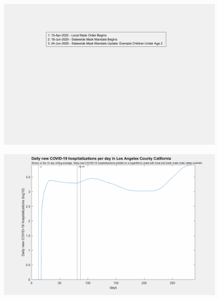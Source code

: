 \documentclass[]{article}
\begin{document}
\begin{figure}[!h]
	\includegraphics[width=\linewidth]{legends/los_angeles_mask_order_legend.png}
	\caption{}
	\label{fig:legends/los_angeles_mask_order_legendLabel}
\end{figure}

\begin{figure}[!h]
	\includegraphics[width=\linewidth]{images/los_angeles_mask_order_hospitalizations_log.png}
	\caption{}
	\label{fig:images/los_angeles_mask_order_hospitalizations_logLabel}
\end{figure}
\end{document}
